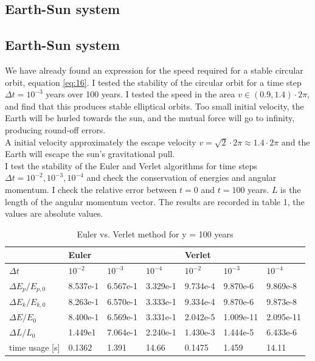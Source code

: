 \documentclass[%
 reprint,
 nobalance,
 amsmath,amssymb,
 aps,
]{revtex4-1}
\begin{document}
\subsection{\label{sec:Sub1}Earth-Sun system}

\subsection{\label{sec:Sub1}Earth-Sun system}
We have already found an expression for the speed required for a stable circular orbit, equation \eqref{eq:16}. I tested the stability of the circular orbit for a time step $\Delta t = 10^{-3}$ years over 100 years. I tested the speed in the area $v \in (0.9, 1.4)\cdot2\pi $, and find that this produces stable elliptical orbits. Too small initial velocity, the Earth will be hurled towards the sun, and the mutual force will go to infinity, producing round-off errors. \\
A initial velocity approximately the escape velocity $v = \sqrt{2}\cdot 2\pi \approx 1.4 \cdot 2\pi$ and the Earth will escape the sun's gravitational pull. \\
I test the stability of the Euler and Verlet algorithms for time steps $\Delta t = 10^{-2}, 10^{-3}, 10^{-4}$ and check the conservation of energies and angular momentum. I check the relative error between $t=0$ and $t=100$ years. $L$ is the length of the angular momentum vector.
The results are recorded in table 1, the values are absolute values.

\begin{widetext}
\begin{table}[h]
\centering
\caption{Euler vs. Verlet method for y = 100 years}
\label{eulVsVer}
\begin{tabular}{@{}lllllll@{}}
\hline
                      & \textbf{Euler} &   &   & \textbf{Verlet} &   &   \\
\hline
$\Delta t$            & $10^{-2}$     & $10^{-3}$ & $10^{-4}$ & $10^{-2}$      & $10^{-3}$ & $10^{-4}$ \\
$\Delta E_p/ E_{p,0}$ & 8.537e-1    & 6.567e-1 & 3.329e-1 &9.734e-4     & 9.870e-6 & 9.869e-8 \\
$\Delta E_k/E_{k,0}$  & 8.263e-1     & 6.570e-1 & 3.333e-1 & 9.334e-4      & 9.870e-6 & 9.873e-8 \\
$\Delta E/ E_0$       & 8.400e-1     & 6.569e-1 & 3.331e-1 & 2.042e-5      & 1.009e-11 & 2.095e-11 \\
$\Delta L/L_0$         & 1.449e1     & 7.064e-1 & 2.240e-1     & 1.430e-3 & 1.444e-5 & 6.433e-6 \\ \hline
time usage {[}s{]}    & 0.1362     & 1.391 & 14.66      & 0.1475 & 1.459 & 14.11
\end{tabular}
\end{table}
\end{widetext}
\end{document}
